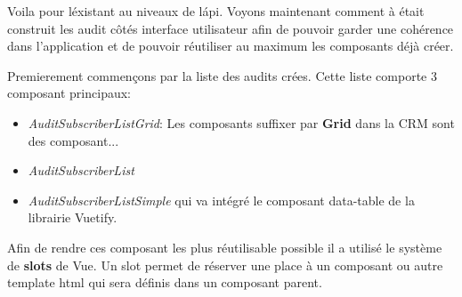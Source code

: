 Voila pour l\'existant au niveaux de l\'api. Voyons maintenant comment à était construit les audit côtés interface utilisateur afin de pouvoir garder une cohérence dans l'application et de pouvoir réutiliser au maximum les composants déjà créer. 

Premierement commençons par la liste des audits crées. Cette liste comporte 3 composant principaux: 
\begin{itemize}
    \item  \textit{AuditSubscriberListGrid}: Les composants suffixer par \textbf{Grid} dans la CRM sont des composant... 
    \item \textit{AuditSubscriberList}
    \item \textit{AuditSubscriberListSimple} qui va intégré le composant data-table de la librairie Vuetify. 
\end{itemize}

Afin de rendre ces composant les plus réutilisable possible il a utilisé le système de \textbf{slots} de Vue. Un slot permet de réserver une place à un composant ou autre template html qui sera définis dans un composant parent. 
